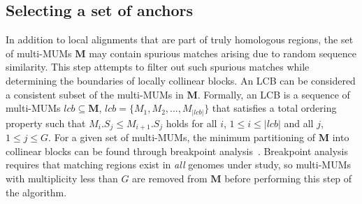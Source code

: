 \documentclass[titlepage,11pt]{article}
\begin{document}
\subsection*{Selecting a set of anchors}
In addition to local alignments that are part of truly homologous regions, the
set of multi-MUMs $\mathbf{M}$ may contain spurious matches arising due to
random sequence similarity.  This step attempts to filter out such spurious
matches while determining the boundaries of locally collinear blocks.
An LCB can be considered a consistent subset of the multi-MUMs in $\mathbf{M}$.
Formally, an LCB is a sequence of multi-MUMs $lcb \subseteq \mathbf{M}$, $lcb =
\{M_1, M_2, ... , M_{|lcb|}\}$ that satisfies a total ordering
property such that $M_i.S_j \leq M_{i+1}.S_j$ holds for all $i$, $1 \leq
i \leq |lcb|$ and all $j$, $1 \leq j \leq G$.  For a given set of multi-MUMs,
the minimum partitioning of $\mathbf{M}$ into collinear blocks can be found
through breakpoint analysis~\citep{breakpointPhylogenies}.  Breakpoint analysis
requires that matching regions exist in \textit{all} genomes under study, so
multi-MUMs with multiplicity less than $G$ are removed from $\mathbf{M}$ before
performing this step of the algorithm.

\end{document}
